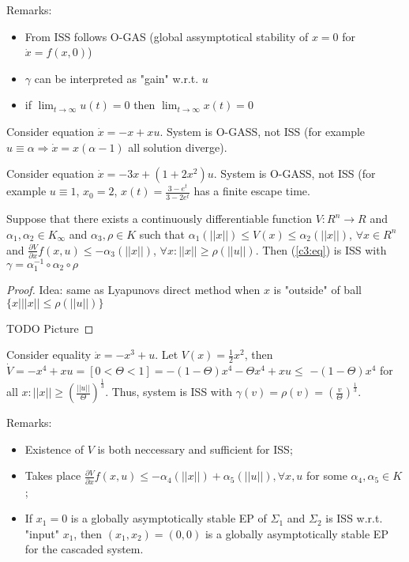 Remarks:

\begin{itemize}
 \item From ISS follows O-GAS (global assymptotical stability of $x=0$ for
   $\dot x=f(x,0)$)
 \item $\gamma$ can be interpreted as "gain" w.r.t. $u$
 \item if $\lim_{t\to\infty} u(t)=0$ then $\lim_{t \to\infty}x(t)=0$
\end{itemize}

\begin{Example}
 Consider equation $\dot x = -x+xu$. System is O-GASS, not ISS (for example
 $u\equiv\alpha \Rightarrow \dot x = x (\alpha-1)$ all solution diverge).
\end{Example}

\begin{Example}
 Consider equation $\dot x =-3x+(1+2x^2)u$. System is O-GASS, not ISS (for example 
 $u\equiv1$, $x_0=2$, $x(t)=\frac{3-e^{t}}{3-2e^{t}}$ has a finite escape time.
\end{Example}

\begin{Theorem}
 Suppose that there exists a continuously differentiable function 
 $V:R^n\to R$ and $\alpha_1,\alpha_2\in K_\infty$ and $\alpha_3, \rho \in K$
 such that $\alpha_1(||x||)\le V(x)\le\alpha_2(||x||)$, $\forall x\in R^n$ and
 $\frac{\partial V}{\partial x}f(x,u)\le-\alpha_3(||x||)$,
 $\forall x: ||x||\ge\rho(||u||)$. Then (\ref{c3:eq}) is ISS with 
 $\gamma = \alpha_1^{-1} \circ \alpha_2\circ\rho$

 \begin{proof}
 Idea: same as Lyapunovs direct method when $x$ is "outside" of ball
 $\{x | ||x||\le\rho(||u||)\}$

 TODO Picture
 \end{proof}
\end{Theorem}


\begin{Example}
 Consider equality $\dot x = -x^3+u$. Let $V(x)=\frac{1}{2}x^2$, then
 $\dot V = -x^4+xu=[0<\Theta<1]=-(1-\Theta)x^4-\Theta x^4+xu\le$
 $-(1-\Theta)x^4$ for all $x: ||x||\ge\left(\frac{||u||}{\Theta}\right)^\frac{1}{3}$.
 Thus, system is ISS with 
 $\gamma(v)=\rho(v)=\left(\frac{v}{\Theta}\right)^\frac{1}{3}$.
\end{Example}


Remarks:
\begin{itemize}
 \item Existence of $V$ is both neccessary and sufficient for ISS;
 \item Takes place $\frac{\partial V}{\partial x}f(x,u) \le -\alpha_4(||x||)+\alpha_5(||u||), \forall x,u$ for some $\alpha_4,\alpha_5\in K$;
 \item %
  If $x_1=0$ is a globally asymptotically stable EP of $\Sigma_1$ and $\Sigma_2$ is ISS w.r.t. "input" $x_1$, then $(x_1,x_2)=(0,0)$ is a globally asymptotically stable EP for the cascaded system.
\end{itemize}


